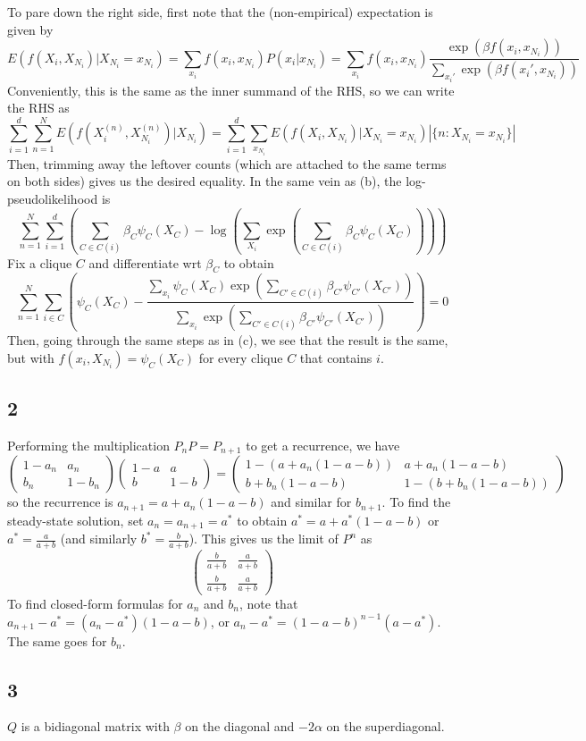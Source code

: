 \documentclass{article}
\newcommand{\openm}{\begin{pmatrix}}
\newcommand{\closem}{\end{pmatrix}}
\begin{document}
To pare down the right side, first note that the (non-empirical) expectation is given by
\[E(f(X_i,X_{N_i})|X_{N_i}=x_{N_i})=\sum_{x_i}f(x_i,x_{N_i})P(x_i|x_{N_i})=\sum_{x_i}f(x_i, x_{N_i})\frac{\exp\left(\beta f(x_i,x_{N_i})\right)}{\sum_{x_i'}\exp\left(\beta f(x_i',x_{N_i})\right)}\]
Conveniently, this is the same as the inner summand of the RHS, so we can write the RHS as
\[\sum_{i=1}^d\sum_{n=1}^NE(f(X_i^{(n)},X_{N_i}^{(n)})|X_{N_i})=\sum_{i=1}^d\sum_{x_{N_i}}E(f(X_i,X_{N_i})|X_{N_i}=x_{N_i})\left|\{n:X_{N_i}=x_{N_i}\}\right|\]
Then, trimming away the leftover counts (which are attached to the same terms on both sides) gives us the desired equality.
In the same vein as (b), the log-pseudolikelihood is
\[\sum_{n=1}^N\sum_{i=1}^d\left(\sum_{C\in C(i)}\beta_C\psi_{C}(X_{C})-\log\left(\sum_{X_i}\exp\left(\sum_{C\in C(i)}\beta_C\psi_C(X_C)\right)\right)\right)\]
Fix a clique $C$ and differentiate wrt $\beta_C$ to obtain
\[\sum_{n=1}^N\sum_{i\in C}\left(\psi_C(X_C)-\frac{\sum_{x_i}\psi_C(X_C)\exp\left(\sum_{C'\in C(i)}\beta_{C'}\psi_{C'}(X_{C'})\right)}{\sum_{x_i}\exp\left(\sum_{C'\in C(i)}\beta_{C'}\psi_{C'}(X_{C'})\right)}\right)=0\]
Then, going through the same steps as in (c), we see that the result is the same, but with $f(x_i,X_{N_i})=\psi_C(X_C)$ for every clique $C$ that contains $i$.
\subsection*{2}
Performing the multiplication $P_nP=P_{n+1}$ to get a recurrence, we have
\[\openm1-a_n&a_n\\b_n&1-b_n\closem\openm1-a&a\\b&1-b\closem=\openm1-(a+a_n(1-a-b))&a+a_n(1-a-b)\\b+b_n(1-a-b)&1-(b+b_n(1-a-b))\closem\]
so the recurrence is $a_{n+1}=a+a_n(1-a-b)$ and similar for $b_{n+1}$. To find the steady-state solution, set $a_n=a_{n+1}=a^*$ to obtain $a^*=a+a^*(1-a-b)$ or $a^*=\frac{a}{a+b}$ (and similarly $b^*=\frac{b}{a+b}$). This gives us the limit of $P^n$ as 
\[\openm\frac{b}{a+b}&\frac{a}{a+b}\\\frac{b}{a+b}&\frac{a}{a+b}\closem\]
To find closed-form formulas for $a_n$ and $b_n$, note that $a_{n+1}-a^*=(a_n-a^*)(1-a-b)$, or $a_n-a^*=(1-a-b)^{n-1}(a-a^*)$. The same goes for $b_n$.
\subsection*{3}
\vspace{130pt}
$Q$ is a bidiagonal matrix with $\beta$ on the diagonal and $-2\alpha$ on the superdiagonal.
\end{document}
